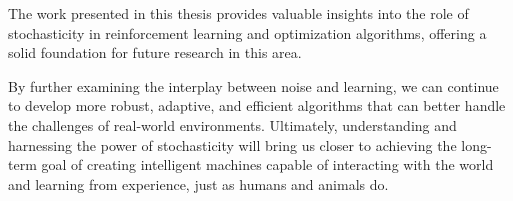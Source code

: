 The work presented in this thesis provides valuable insights into the role of stochasticity in reinforcement learning and optimization algorithms, offering a solid foundation for future research in this area.

By further examining the interplay between noise and learning, we can continue to develop more robust, adaptive, and efficient algorithms that can better handle the challenges of real-world environments. Ultimately, understanding and harnessing the power of stochasticity will bring us closer to achieving the long-term goal of creating intelligent machines capable of interacting with the world and learning from experience, just as humans and animals do.




 
 






